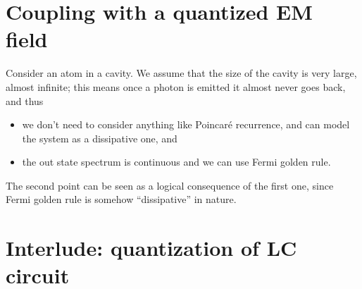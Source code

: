 \documentclass[hyperref, a4paper]{article}
\begin{document}

\section{Coupling with a quantized EM field}

Consider an atom in a cavity.
We assume that the size of the cavity is very large, almost infinite; 
this means once a photon is emitted it almost never goes back,
and thus
\begin{itemize}
    \item we don't need to consider anything like Poincaré recurrence, 
        and can model the system as a dissipative one, and 
    \item the out state spectrum is continuous 
        and we can use Fermi golden rule.
\end{itemize}
The second point can be seen as a logical consequence of the first one,
since Fermi golden rule is somehow ``dissipative'' in nature.

\section{Interlude: quantization of LC circuit}
\end{document}
